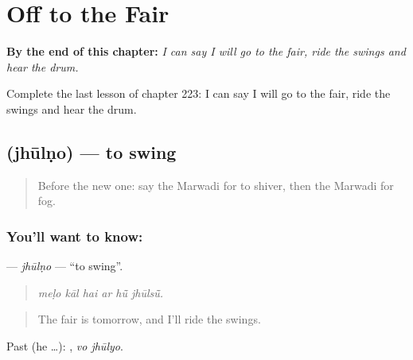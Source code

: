 
\chapter{Off to the Fair}
\label{ch:mw-off-to-the-fair}

\begin{chapteropening}
\textbf{By the end of this chapter:} \emph{I can say I will go to the fair, ride the swings and hear the drum.}

Complete the last lesson of chapter 223: I can say I will go to the fair, ride the swings and hear the drum.
\end{chapteropening}

\section[\texorpdfstring{\mw{झूलणो} (jhūlṇo)}{झूलणो (jhūlṇo)}]{ (jhūlṇo) — to swing}

\label{lesson:MW-C223-jhulno}



\begin{quote}
Before the new one: say the Marwadi for to shiver, then the Marwadi for fog.
\end{quote}

\subsection*{You'll want to know: }
\textbf{} — \emph{jhūlṇo} — \textquotedblleft{}to swing\textquotedblright{}.

\begin{quote}
     
\end{quote}

\begin{quote}
\emph{meḷo kāl hai ar hū̃ jhūlsū̃.}
\end{quote}

\begin{quote}
The fair is tomorrow, and I'll ride the swings.
\end{quote}

Past (he …):  , \emph{vo jhūlyo}.


